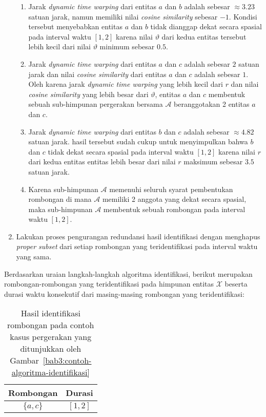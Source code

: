 \begin{enumerate}
    \begin{enumerate}
        \item Jarak \textit{dynamic time warping} dari entitas $a$ dan $b$ adalah sebesar $\approx 3.23$ satuan jarak, namun memiliki nilai \textit{cosine similarity} sebesar $-1$. Kondisi tersebut menyebabkan entitas $a$ dan $b$ tidak dianggap dekat secara spasial pada interval waktu $[1, 2]$ karena nilai $\vartheta$ dari kedua entitas tersebut lebih kecil dari nilai $\vartheta$ minimum sebesar $0.5$.
        \item Jarak \textit{dynamic time warping} dari entitas $a$ dan $c$ adalah sebesar $2$ satuan jarak dan nilai \textit{cosine similarity} dari entitas $a$ dan $c$ adalah sebesar $1$. Oleh karena jarak \textit{dynamic time warping} yang lebih kecil dari $r$ dan nilai \textit{cosine similarity} yang lebih besar dari $\vartheta$, entitas $a$ dan $c$ membentuk sebuah sub-himpunan pergerakan bersama $\mathcal{A}$ beranggotakan 2 entitas $a$ dan $c$.
        \item Jarak \textit{dynamic time warping} dari entitas $b$ dan $c$ adalah sebesar $\approx 4.82$ satuan jarak. hasil tersebut sudah cukup untuk menyimpulkan bahwa $b$ dan $c$ tidak dekat secara spasial pada interval waktu $[1, 2]$ karena nilai $r$ dari kedua entitas entitas lebih besar dari nilai $r$ maksimum sebesar $3.5$ satuan jarak.
        \item Karena sub-himpunan $\mathcal{A}$ memenuhi seluruh syarat pembentukan rombongan di mana $\mathcal{A}$ memiliki 2 anggota yang dekat secara spasial, maka sub-himpunan $\mathcal{A}$ membentuk sebuah rombongan pada interval waktu $[1, 2]$.
    \end{enumerate}
    
    \item Lakukan proses pengurangan redundansi hasil identifikasi dengan menghapus \textit{proper subset} dari setiap rombongan yang teridentifikasi pada interval waktu yang sama.
\end{enumerate}

Berdasarkan uraian langkah-langkah algoritma identifikasi, berikut merupakan rombongan-rombongan yang teridentifikasi pada himpunan entitas $\mathcal{X}$ beserta durasi waktu konsekutif dari masing-masing rombongan yang teridentifikasi:

\begin{table}[h]
    \centering
    \captionsetup{width=0.6\textwidth}
    \caption{Hasil identifikasi rombongan pada contoh kasus pergerakan yang ditunjukkan oleh Gambar~\ref{bab3:contoh-algoritma-identifikasi}}
    \begin{tabular}{|c|c|}
        \hline
        Rombongan & Durasi \\
        \hline
        $\{ a, c \}$ & $[1, 2]$ \\
        \hline
    \end{tabular}
    \label{bab6:contoh-identifikasi-non-redundan}
\end{table}

